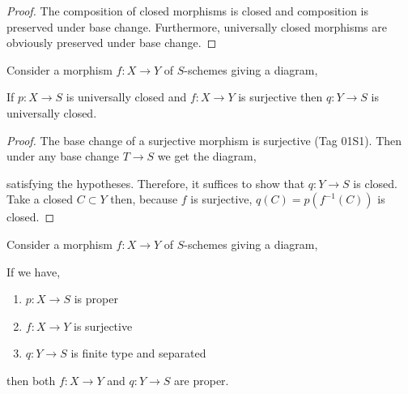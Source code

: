 \documentclass[12pt]{article}
\begin{document}
\begin{proof}
The composition of closed morphisms is closed and composition is preserved under base change. Furthermore, universally closed morphisms are obviously preserved under base change.
\end{proof}

\begin{prop}
Consider a morphism $f : X \to Y$ of $S$-schemes giving a diagram,
\begin{center}
\end{center}
If $p : X \to S$ is universally closed and $f : X \to Y$ is surjective then $q : Y \to S$ is universally closed. 
\end{prop}

\begin{proof}
The base change of a surjective morphism is surjective (Tag 01S1). Then under any base change $T \to S$ we get the diagram,
\begin{center}
\end{center}
satisfying the hypotheses. Therefore, it suffices to show that $q : Y \to S$ is closed. Take a closed $C \subset Y$ then, because $f$ is surjective, $q(C) = p(f^{-1}(C))$ is closed.
\end{proof}

\begin{cor}
Consider a morphism $f : X \to Y$ of $S$-schemes giving a diagram,
\begin{center}
\end{center}
If we have,
\begin{enumerate}
\item $p : X \to S$ is proper
\item $f : X \to Y$ is surjective 
\item $q : Y \to S$ is finite type and separated
\end{enumerate}
then both $f : X \to Y$ and $q : Y \to S$ are proper.
\end{cor}
\end{document}
